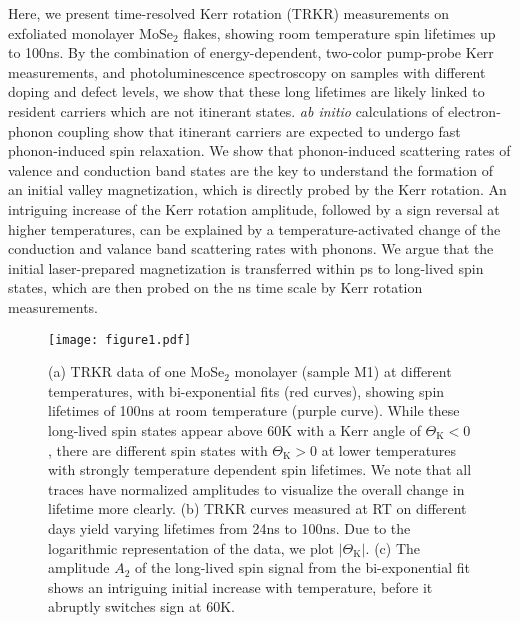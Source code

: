 \documentclass[prb,aps,superscriptaddress,reprint]{revtex4-1}
\begin{document}
Here, we present time-resolved Kerr rotation (TRKR) measurements on exfoliated monolayer MoSe$_2$ flakes, showing room temperature spin lifetimes up to \unit{100}{ns}. By the combination of energy-dependent, two-color pump-probe Kerr measurements, and photoluminescence spectroscopy on samples with different doping and defect levels,
we show that these long lifetimes are likely linked to resident carriers which are not itinerant states. \textit{ab initio} calculations of electron-phonon coupling show that itinerant carriers are expected to undergo fast phonon-induced spin relaxation. 
We show that phonon-induced scattering rates of valence and conduction band states are the key to understand the formation of an initial valley magnetization, which is directly probed by the Kerr rotation. An intriguing increase of the Kerr rotation amplitude, followed by a sign reversal at higher temperatures, can be explained by a temperature-activated change of the conduction and valance band scattering rates with phonons. We argue that the initial laser-prepared magnetization is transferred within ps to long-lived spin states, which are then probed on the ns time scale by Kerr rotation measurements.

\begin{figure*}[tb]
		\texttt{[image: figure1.pdf]}
	\caption{(a) TRKR data of one MoSe$_2$ monolayer (sample M1) at different temperatures, with bi-exponential fits (red curves), showing spin lifetimes of \unit{100}{ns} at room temperature (purple curve). While these long-lived spin states appear above \unit{60}{K} with a Kerr angle of $\Theta_\text{K}<0$, there are different spin states with $\Theta_\text{K}>0$ at lower temperatures with strongly temperature dependent spin lifetimes. We note that all traces have normalized amplitudes to visualize the overall change in lifetime more clearly. (b) TRKR curves measured at RT on different days yield varying lifetimes from \unit{24}{ns} to \unit{100}{ns}. Due to the logarithmic representation of the data, we plot $|\Theta_\text{K}|$. (c) The amplitude $A_2$ of the long-lived spin signal from the bi-exponential fit shows an intriguing initial increase with temperature, before it abruptly switches sign at \unit{60}{K}.}
	\label{figure1}
\end{figure*}
\end{document}
